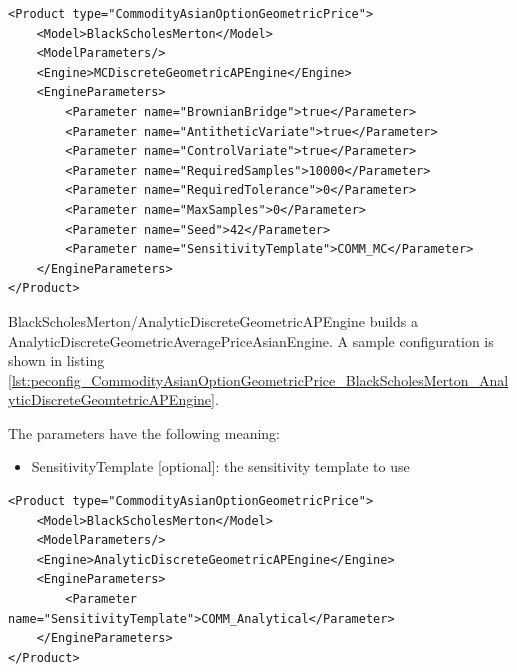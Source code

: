 \begin{longlisting}
\begin{verbatim}
<Product type="CommodityAsianOptionGeometricPrice">
    <Model>BlackScholesMerton</Model>
    <ModelParameters/>
    <Engine>MCDiscreteGeometricAPEngine</Engine>
    <EngineParameters>
        <Parameter name="BrownianBridge">true</Parameter>
        <Parameter name="AntitheticVariate">true</Parameter>
        <Parameter name="ControlVariate">true</Parameter>
        <Parameter name="RequiredSamples">10000</Parameter>
        <Parameter name="RequiredTolerance">0</Parameter>
        <Parameter name="MaxSamples">0</Parameter>
        <Parameter name="Seed">42</Parameter>
        <Parameter name="SensitivityTemplate">COMM_MC</Parameter>
    </EngineParameters>
</Product>
\end{verbatim}
\caption{Configuration for Product CommodityAsianOptionGeometricPrice, Model BlackScholesMerton, Engine MCDiscreteGeometricAPEngine}
\label{lst:peconfig_CommodityAsianOptionGeometricPrice_BlackScholesMerton_MCDiscreteGeomtetricAPEngine}
\end{longlisting}

BlackScholesMerton/AnalyticDiscreteGeometricAPEngine builds a AnalyticDiscreteGeometricAveragePriceAsianEngine. A sample
configuration is shown in listing
\ref{lst:peconfig_CommodityAsianOptionGeometricPrice_BlackScholesMerton_AnalyticDiscreteGeomtetricAPEngine}.

The parameters have the following meaning:

\begin{itemize}
\item SensitivityTemplate [optional]: the sensitivity template to use
\end{itemize}

\begin{longlisting}
\begin{verbatim}
<Product type="CommodityAsianOptionGeometricPrice">
    <Model>BlackScholesMerton</Model>
    <ModelParameters/>
    <Engine>AnalyticDiscreteGeometricAPEngine</Engine>
    <EngineParameters>
        <Parameter name="SensitivityTemplate">COMM_Analytical</Parameter>
    </EngineParameters>
</Product>
\end{verbatim}
\caption{Configuration for Product CommodityAsianOptionGeometricPrice, Model BlackScholesMerton, Engine AnalyticDiscreteGeomtetricAPEngine}
\label{lst:peconfig_CommodityAsianOptionGeometricPrice_BlackScholesMerton_AnalyticDiscreteGeomtetricAPEngine}
\end{longlisting}

